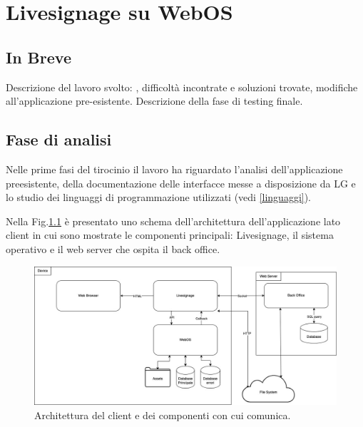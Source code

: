 \chapter{Livesignage su WebOS}\label{svolgimento}
\section{In Breve}
Descrizione del lavoro svolto: , difficoltà incontrate e soluzioni trovate, modifiche all'applicazione pre-esistente. Descrizione della fase di testing finale.

\section{Fase di analisi}

Nelle prime fasi del tirocinio il lavoro ha riguardato l'analisi dell'applicazione preesistente, della documentazione delle interfacce messe a disposizione da LG e lo studio dei linguaggi di programmazione utilizzati (vedi \ref*{linguaggi}).

Nella Fig.\ref*{fig:architettura_2} è presentato uno schema dell'architettura dell'applicazione lato client in cui sono mostrate le componenti principali: Livesignage, il sistema operativo e il web server che ospita il back office.

\begin{figure}[!htb]
    \centering
    \includegraphics[width= 1\textwidth]{images/svolgimento/webos_client_archi.jpg} 
    \caption{Architettura del client e dei componenti con cui comunica.} 
    \label{fig:architettura_2}
\end{figure}

